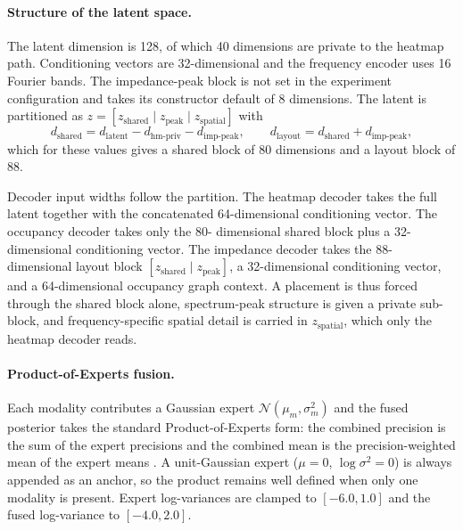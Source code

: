 \paragraph{Structure of the latent space.} The latent dimension is 128, of which 40 dimensions are
private to the heatmap path. Conditioning vectors are 32-dimensional and the frequency encoder uses
16 Fourier bands. The impedance-peak block is not set in the experiment configuration and takes its
constructor default of 8 dimensions. The latent is partitioned as
$z = [z_{\mathrm{shared}} \mid z_{\mathrm{peak}} \mid z_{\mathrm{spatial}}]$ with
\begin{equation}
d_{\mathrm{shared}} = d_{\mathrm{latent}} - d_{\mathrm{hm\text{-}priv}} - d_{\mathrm{imp\text{-}peak}},
\qquad
d_{\mathrm{layout}} = d_{\mathrm{shared}} + d_{\mathrm{imp\text{-}peak}} ,
\label{eq:latent_partition}
\end{equation}
which for these values gives a shared block of 80 dimensions and a layout block of 88.

Decoder input widths follow the partition. The heatmap decoder takes the full latent together with
the concatenated 64-dimensional conditioning vector. The occupancy decoder takes only the 80-
dimensional shared block plus a 32-dimensional conditioning vector. The impedance decoder takes the
88-dimensional layout block $[z_{\mathrm{shared}} \mid z_{\mathrm{peak}}]$, a 32-dimensional
conditioning vector, and a 64-dimensional occupancy graph context. A placement is thus forced through
the shared block alone, spectrum-peak structure is given a private sub-block, and frequency-specific
spatial detail is carried in $z_{\mathrm{spatial}}$, which only the heatmap decoder reads.

\paragraph{Product-of-Experts fusion.} Each modality contributes a Gaussian expert
$\mathcal{N}(\mu_m, \sigma_m^2)$ and the fused posterior takes the standard Product-of-Experts form:
the combined precision is the sum of the expert precisions and the combined mean is the
precision-weighted mean of the expert means \cite{wu2018mvae}. A unit-Gaussian expert
($\mu = 0$, $\log \sigma^2 = 0$) is always appended as an anchor, so the product remains well defined
when only one modality is present. Expert log-variances are clamped to $[-6.0, 1.0]$ and the fused
log-variance to $[-4.0, 2.0]$.

